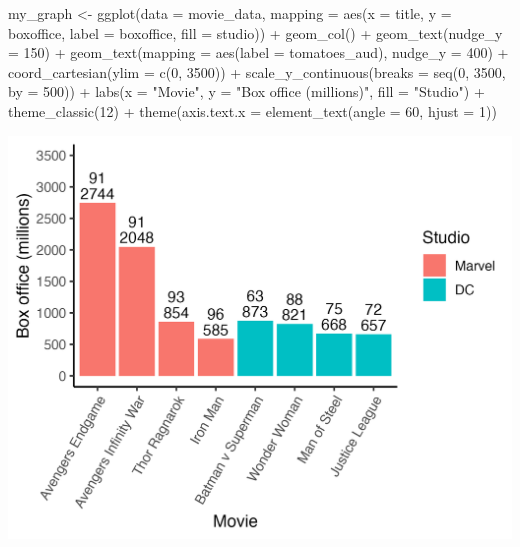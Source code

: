 \documentclass[
]{krantz}
\makeatletter
\newenvironment{Shaded}{\begin{snugshade}}{\end{snugshade}}
\newcommand{\AttributeTok}[1]{\textcolor[rgb]{0.61,0.61,0.61}{#1}}
\newcommand{\DecValTok}[1]{\textcolor[rgb]{0.06,0.06,0.06}{#1}}
\newcommand{\FunctionTok}[1]{\textcolor[rgb]{0,0,0}{#1}}
\newcommand{\NormalTok}[1]{#1}
\newcommand{\OtherTok}[1]{\textcolor[rgb]{0.37,0.37,0.37}{#1}}
\newcommand{\SpecialCharTok}[1]{\textcolor[rgb]{0,0,0}{#1}}
\newcommand{\StringTok}[1]{\textcolor[rgb]{0.5,0.5,0.5}{#1}}
\newenvironment{kframe}{%
\medskip{}
\setlength{\fboxsep}{.8em}
 \def\at@end@of@kframe{}%
 \ifinner\ifhmode%
  \def\at@end@of@kframe{\end{minipage}}%
  \begin{minipage}{\columnwidth}%
 \fi\fi%
 \def\FrameCommand##1{\hskip\@totalleftmargin \hskip-\fboxsep
 \colorbox{shadecolor}{##1}\hskip-\fboxsep
     \hskip-\linewidth \hskip-\@totalleftmargin \hskip\columnwidth}%
 \MakeFramed {\advance\hsize-\width
   \@totalleftmargin\z@ \linewidth\hsize
   \@setminipage}}%
 {\par\unskip\endMakeFramed%
 \at@end@of@kframe}
\renewenvironment{Shaded}{\begin{kframe}}{\end{kframe}}
\makeatother
\begin{document}
\begin{Shaded}
\begin{Highlighting}[]
\NormalTok{my\_graph }\OtherTok{\textless{}{-}} \FunctionTok{ggplot}\NormalTok{(}\AttributeTok{data =}\NormalTok{ movie\_data,}
           \AttributeTok{mapping =} \FunctionTok{aes}\NormalTok{(}\AttributeTok{x =}\NormalTok{ title,}
                         \AttributeTok{y =}\NormalTok{ boxoffice,}
                         \AttributeTok{label =}\NormalTok{ boxoffice, }
                         \AttributeTok{fill =}\NormalTok{ studio)) }\SpecialCharTok{+}
  \FunctionTok{geom\_col}\NormalTok{() }\SpecialCharTok{+}
  \FunctionTok{geom\_text}\NormalTok{(}\AttributeTok{nudge\_y =} \DecValTok{150}\NormalTok{)  }\SpecialCharTok{+}
  \FunctionTok{geom\_text}\NormalTok{(}\AttributeTok{mapping =} \FunctionTok{aes}\NormalTok{(}\AttributeTok{label =}\NormalTok{ tomatoes\_aud), }
            \AttributeTok{nudge\_y =} \DecValTok{400}\NormalTok{) }\SpecialCharTok{+}
  \FunctionTok{coord\_cartesian}\NormalTok{(}\AttributeTok{ylim =} \FunctionTok{c}\NormalTok{(}\DecValTok{0}\NormalTok{, }\DecValTok{3500}\NormalTok{)) }\SpecialCharTok{+}
  \FunctionTok{scale\_y\_continuous}\NormalTok{(}\AttributeTok{breaks =} \FunctionTok{seq}\NormalTok{(}\DecValTok{0}\NormalTok{, }\DecValTok{3500}\NormalTok{, }\AttributeTok{by =} \DecValTok{500}\NormalTok{)) }\SpecialCharTok{+}
  \FunctionTok{labs}\NormalTok{(}\AttributeTok{x =} \StringTok{"Movie"}\NormalTok{,}
       \AttributeTok{y =} \StringTok{"Box office (millions)"}\NormalTok{,}
       \AttributeTok{fill =} \StringTok{"Studio"}\NormalTok{) }\SpecialCharTok{+}
  \FunctionTok{theme\_classic}\NormalTok{(}\DecValTok{12}\NormalTok{) }\SpecialCharTok{+}
  \FunctionTok{theme}\NormalTok{(}\AttributeTok{axis.text.x =} \FunctionTok{element\_text}\NormalTok{(}\AttributeTok{angle =} \DecValTok{60}\NormalTok{, }
                                   \AttributeTok{hjust =} \DecValTok{1}\NormalTok{))  }
\end{Highlighting}
\end{Shaded}

\includegraphics[width=0.65\linewidth]{ch_graphing/images/custom_order}
\end{document}
